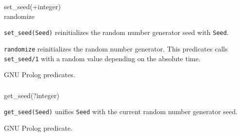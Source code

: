\begin{TemplatesOneCol}
set\_seed(+integer)\\
randomize

\end{TemplatesOneCol}

\Description

\texttt{set\_seed(Seed)} reinitializes the random number generator seed with
\texttt{Seed}.

\texttt{randomize} reinitializes the random number generator. This
predicates calls \texttt{set\_seed/1} with a random value depending on the
absolute time.

\begin{PlErrors}




\end{PlErrors}

\Portability

GNU Prolog predicates.

\subsubsection{}

\begin{TemplatesOneCol}
get\_seed(?integer)

\end{TemplatesOneCol}

\Description

\texttt{get\_seed(Seed)} unifies \texttt{Seed} with the current random
number generator seed.

\begin{PlErrors}



\end{PlErrors}

\Portability

GNU Prolog predicate.

